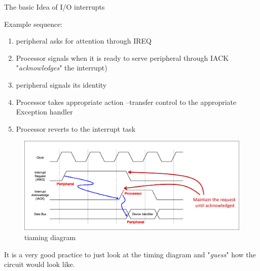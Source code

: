 \begin{parag}{The basic Idea of I/O interrupts}
\begin{center}
	\end{center}
	\begin{subparag}{Example sequence}:
	    \begin{enumerate}
	        \item peripheral asks for attention through IREQ
	        \item Processor signals when it is ready to serve peripheral through IACK "\textit{acknowledges}" the interrupt)
	        \item peripheral signals its identity
	        \item Processor takes appropriate action --transfer control to the appropriate Exception handler
	        \item Processor reverts to the interrupt task
	    \end{enumerate}
	
	\end{subparag}
\end{parag}
		\begin{figure}[h!]
		    \centering
			\includegraphics[scale=0.2]{screenshots/2025-10-22_14.png}
			\caption{tiaming diagram}
		\end{figure}
\begin{framedremark}
It is a very good practice to just look at the timing diagram and "\textit{guess}" how the circuit would look like.
\end{framedremark}
